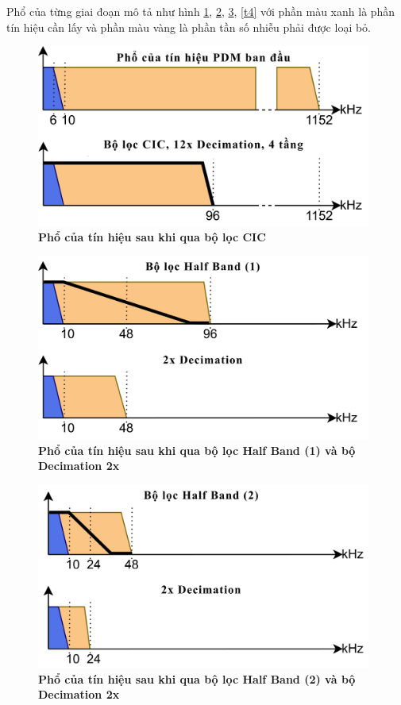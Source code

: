  Phổ của từng giai đoạn mô tả như hình 
 \ref{t1}, \ref{t2}, \ref{t3}, \ref{t4} với phần màu xanh là phần tín hiệu cần lấy và phần màu vàng là phần tần số nhiễu phải được loại bỏ.
 \vspace{1.5cm}
 \begin{figure}[H]
    \centering
    \includegraphics[width=11cm]{Images/Chuong3/1.png}
    \caption[Phổ của tín hiệu sau khi qua bộ lọc CIC]{\bfseries \fontsize{12pt}{0pt}\selectfont Phổ của tín hiệu sau khi qua bộ lọc CIC}
    \label{t1}
\end{figure}
\begin{figure}[H]
    \centering
    \includegraphics[width=11cm]{Images/Chuong3/2.png}
    \caption[Phổ của tín hiệu sau khi qua bộ lọc Half Band (1) và bộ Decimation 2x]{\bfseries \fontsize{12pt}{0pt}\selectfont Phổ của tín hiệu sau khi qua bộ lọc Half Band (1) và bộ Decimation 2x}
    \label{t2}
\end{figure}
\begin{figure}[H]
    \centering
    \includegraphics[width=11cm]{Images/Chuong3/3.png}
    \caption[Phổ của tín hiệu sau khi qua bộ lọc Half Band (2) và bộ Decimation 2x]{\bfseries \fontsize{12pt}{0pt}\selectfont Phổ của tín hiệu sau khi qua bộ lọc Half Band (2) và bộ Decimation 2x}
    \label{t3}
\end{figure}
